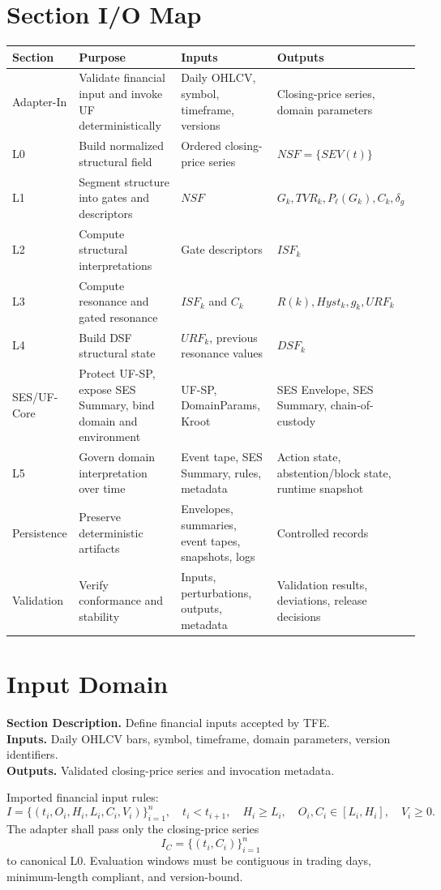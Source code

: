 \documentclass[11pt]{report}
\newcommand{\meta}[3]{\textbf{Section Description.} #1\\
\textbf{Inputs.} #2\\
\textbf{Outputs.} #3\par}
\begin{document}
\section{Section I/O Map}
\begin{longtable}{p{}p{}p{}p{}}
\toprule
Section & Purpose & Inputs & Outputs \\
\midrule
Adapter-In & Validate financial input and invoke UF deterministically & Daily OHLCV, symbol, timeframe, versions & Closing-price series, domain parameters \\
L0 & Build normalized structural field & Ordered closing-price series & $NSF=\{SEV(t)\}$ \\
L1 & Segment structure into gates and descriptors & $NSF$ & $G_k,TVR_k,P_\ell(G_k),C_k,\delta_g$ \\
L2 & Compute structural interpretations & Gate descriptors & $ISF_k$ \\
L3 & Compute resonance and gated resonance & $ISF_k$ and $C_k$ & $R(k),Hyst_k,g_k,URF_k$ \\
L4 & Build DSF structural state & $URF_k$, previous resonance values & $DSF_k$ \\
SES/UF-Core & Protect UF-SP, expose SES Summary, bind domain and environment & UF-SP, DomainParams, Kroot & SES Envelope, SES Summary, chain-of-custody \\
L5 & Govern domain interpretation over time & Event tape, SES Summary, rules, metadata & Action state, abstention/block state, runtime snapshot \\
Persistence & Preserve deterministic artifacts & Envelopes, summaries, event tapes, snapshots, logs & Controlled records \\
Validation & Verify conformance and stability & Inputs, perturbations, outputs, metadata & Validation results, deviations, release decisions \\
\bottomrule
\end{longtable}

\section{Input Domain}
\meta{Define financial inputs accepted by TFE.}{Daily OHLCV bars, symbol, timeframe, domain parameters, version identifiers.}{Validated closing-price series and invocation metadata.}

Imported financial input rules:
\[
I = \{(t_i,O_i,H_i,L_i,C_i,V_i)\}_{i=1}^{n},\quad t_i<t_{i+1},\quad H_i\ge L_i,\quad O_i,C_i\in[L_i,H_i],\quad V_i\ge 0.
\]
The adapter shall pass only the closing-price series
\[
I_C = \{(t_i,C_i)\}_{i=1}^{n}
\]
to canonical L0. Evaluation windows must be contiguous in trading days, minimum-length compliant, and version-bound.
\end{document}

